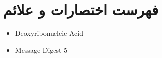 \chapter*{فهرست اختصارات و علائم}
\begin{latin}
\begin{itemize}
    \item[DNA] Deoxyribonucleic Acid
    \item[MD5] Message Digest 5
\end{itemize}
\end{latin}
\newpage
